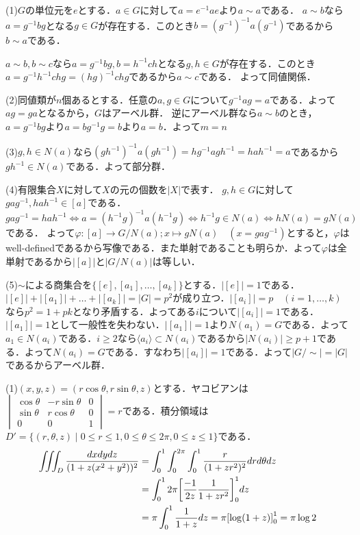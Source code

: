 \documentclass[
		book,
		head_space=20mm,
		foot_space=20mm,
		gutter=10mm,
		line_length=190mm
]{jlreq}
\begin{document}
(1)$G$の単位元を$e$とする．$a \in G$に対して$a=e^{-1}ae$より$a\sim a$である．
$a \sim b$なら$a = g^{-1}bg$となる$g \in G$が存在する．このとき$b=(g^{-1})^{-1}a(g^{-1})$であるから$b \sim a$である．

$a\sim b,b\sim c$なら$a=g^{-1}bg,b=h^{-1}ch$となる$g,h \in G$が存在する．このとき$a=g^{-1}h^{-1}chg=(hg)^{-1}chg$であるから$a\sim c$である．
よって同値関係．

(2)同値類が$n$個あるとする．任意の$a,g \in G$について$g^{-1}ag=a$である．よって$ag=ga$となるから，$G$はアーベル群．
逆にアーベル群なら$a\sim b$のとき，$a=g^{-1}bg$より$a=bg^{-1}g=b$より$a=b$．よって$m=n$

(3)$g,h \in N(a)$なら$(gh^{-1})^{-1}a(gh^{-1})=hg^{-1}agh^{-1}=hah^{-1}=a$であるから$gh^{-1} \in N(a)$である．よって部分群．

(4)有限集合$X$に対して$X$の元の個数を$|X|$で表す．
$g,h \in G$に対して$gag^{-1},hah^{-1}\in [a]$である．
$gag^{-1}=hah^{-1}\Leftrightarrow a= (h^{-1}g)^{-1}a(h^{-1}g) \Leftrightarrow h^{-1}g \in N(a) \Leftrightarrow hN(a)=gN(a)$である．
よって$\varphi\colon [a]\rightarrow G/N(a);x\mapsto gN(a)\quad(x=gag^{-1})$とすると，$\varphi$はwell-definedであるから写像である．また単射であることも明らか．よって$\varphi$は全単射であるから$|[a]|$と$|G/N(a)|$は等しい．

(5)$\sim$による商集合を$\{ [e],[a_1],\dots,[a_k]\}$とする．$|[e]|=1$である．$|[e]|+|[a_1]|+\dots+|[a_k]|=|G|=p^2$が成り立つ．$|[a_i]|=p \quad(i=1,\dots,k)$なら$p^2=1+pk$となり矛盾する．よってある$i$について$|[a_i]|=1$である．$|[a_1]|=1$として一般性を失わない．$|[a_1]|=1$より$N(a_1)=G$である．よって$a_1 \in N(a_i)$である．$i\ge 2$なら$\langle a_i \rangle \subset N(a_i)$であるから$|N(a_i)| \ge p+1$である．よって$N(a_i)=G$である．すなわち$|[a_i]|=1$である．よって$|G/\sim|=|G|$であるからアーベル群．

(1)$(x,y,z)=(r\cos \theta,r\sin \theta,z)$とする．ヤコビアンは$\begin{vmatrix}
    \cos \theta & -r\sin \theta & 0\\
    \sin \theta & r\cos \theta & 0\\
    0 & 0 & 1
\end{vmatrix}=r$である．積分領域は$D'=\{ (r,\theta,z) \mid 0 \le r \le 1,0 \le \theta \le 2\pi,0 \le z \le1 \}$である．
\begin{align}
    \iiint_D\frac{dxdydz}{(1+z(x^2+y^2))^2}&=\int_0^1 \int_0^{2\pi} \int_0^1 \frac{r}{(1+zr^2)^2}drd\theta dz\\
    &=\int_0^1 2\pi \qty[\frac{-1}{2z}\frac{1}{1+zr^2}]_0^1 dz\\
    &=\pi \int_0^1 \frac{1}{1+z}dz=\pi \qty[\log (1+z)]_0^1=\pi \log 2
\end{align}
\end{document}
